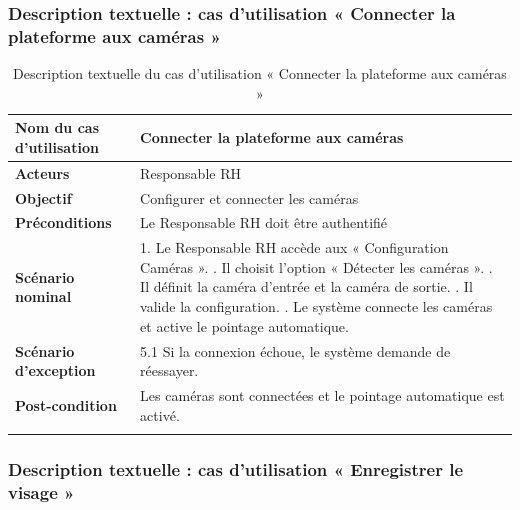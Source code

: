 \subsubsection*{Description textuelle : cas d'utilisation « Connecter la plateforme aux caméras »}

\begin{longtable}{|p{5cm}|p{11cm}|}
\hline
\textbf{Nom du cas d'utilisation} & \textbf{Connecter la plateforme aux caméras} \\ \hline
\textbf{Acteurs}                  & Responsable RH \\ \hline
\textbf{Objectif}                 & Configurer et connecter les caméras \\ \hline
\textbf{Préconditions}            & Le Responsable RH doit être authentifié \\ \hline
\textbf{Scénario nominal} &
1. Le Responsable RH accède aux « Configuration Caméras ». \newline
2. Il choisit l'option « Détecter les caméras ». \newline
3. Il définit la caméra d'entrée et la caméra de sortie. \newline
4. Il valide la configuration. \newline
5. Le système connecte les caméras et active le pointage automatique. \\ \hline
\textbf{Scénario d'exception} &
5.1 Si la connexion échoue, le système demande de réessayer. \\ \hline
\textbf{Post-condition} & Les caméras sont connectées et le pointage automatique est activé. \\ \hline
\caption{Description textuelle du cas d'utilisation « Connecter la plateforme aux caméras »}
\end{longtable}

\subsubsection*{Description textuelle : cas d'utilisation « Enregistrer le visage »}

